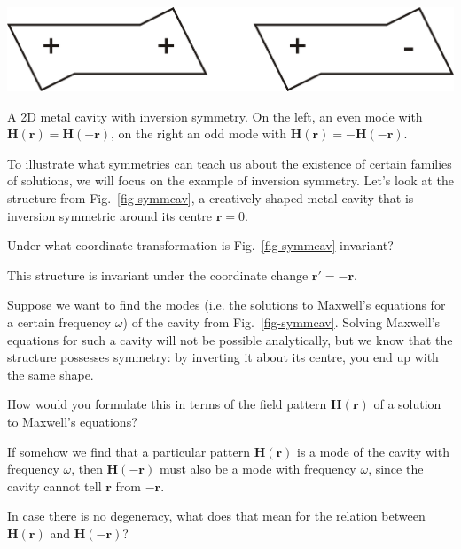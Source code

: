 \begin{marginfigure}
\centering
\includegraphics{symmetry/figures/symmcav}
\caption{A 2D metal cavity with inversion symmetry. On the left, an even mode with ${\mathbf H}({\mathbf r}) = {\mathbf H}(-{\mathbf r})$, on the right an odd mode with ${\mathbf H}({\mathbf r})=-{\mathbf H}(-{\mathbf r})$.}
\label{fig-symmcav}
\end{marginfigure}

To illustrate what symmetries can teach us about the existence of certain families of solutions, we will focus on the example of inversion symmetry. Let's look at the structure from Fig.~\ref{fig-symmcav}, a creatively shaped metal cavity that is inversion symmetric around its centre $\mathbf{r}=0$.

\begin{cue}
Under what coordinate transformation is Fig.~\ref{fig-symmcav} invariant?   
\end{cue}

This structure is invariant under the coordinate change ${\mathbf r}' = -{\mathbf r}$.

Suppose we want to find the modes (i.e. the solutions to Maxwell's equations for a certain frequency $\omega$) of the cavity from Fig.~\ref{fig-symmcav}. Solving Maxwell's equations for such a cavity will not be possible analytically, but we know that the structure possesses symmetry: by inverting it about its centre, you end up with the same shape.

\begin{cue}
How would you formulate this in terms of the field pattern ${\mathbf H({\mathbf r})}$ of a solution to Maxwell's equations?    
\end{cue}

If somehow we find that a particular pattern ${\mathbf H({\mathbf r})}$ is a mode of the cavity with frequency $\omega$, then ${\mathbf H(-{\mathbf r})}$ must also be a mode with frequency $\omega$, since the cavity cannot tell ${\mathbf r}$ from ${-\mathbf{r}}$.

\begin{cue}
In case there is no degeneracy, what does that mean for the relation between ${\mathbf H({\mathbf r})}$ and ${\mathbf H({\mathbf{-r}})}$?    
\end{cue}


